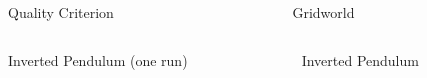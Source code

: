 \documentclass[xcolor=x11names,12pt]{beamer}
\begin{document}
\begin{frame}
\begin{columns}
\begin{column}{.48\textwidth}
    \end{column}
  \end{columns}
\vfill
  \begin{columns}
    \begin{column}{.48\textwidth}
      \begin{block}{Quality Criterion}
        \centering
        \fontsize{11pt}{11pt}\selectfont
        \resizebox{.55\columnwidth}{!}{}
      \end{block}
    \end{column}
    \begin{column}{.48\textwidth}
      \begin{block}{Gridworld}
        \centering
        \fontsize{11pt}{11pt}\selectfont
        \resizebox{.55\columnwidth}{!}{}
      \end{block}
    \end{column}
  \end{columns}
  \begin{columns}
    \begin{column}{.48\textwidth}
      \begin{block}{Inverted Pendulum (one run)}
        \centering
        \fontsize{11pt}{11pt}\selectfont
        \resizebox{.55\columnwidth}{!}{}
      \end{block}
    \end{column}
    \begin{column}{.48\textwidth}
      \begin{block}{Inverted Pendulum}
        \centering
        \fontsize{11pt}{11pt}\selectfont
        \resizebox{.55\columnwidth}{!}{}
      \end{block}
    \end{column}
  \end{columns}



\end{frame}
\end{document}
